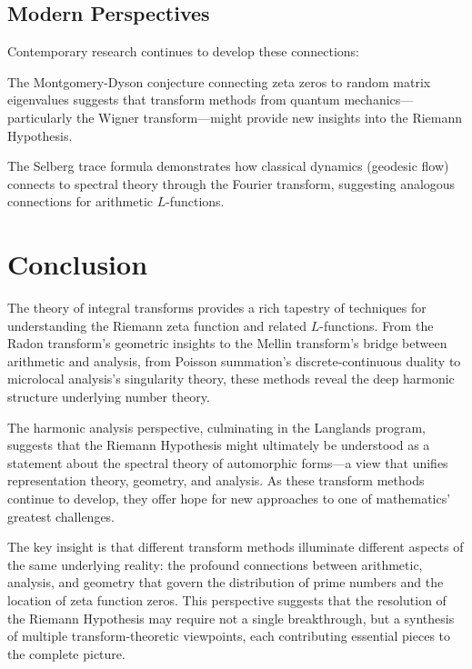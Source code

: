 \subsection{Modern Perspectives}

Contemporary research continues to develop these connections:

\begin{example}
The Montgomery-Dyson conjecture connecting zeta zeros to random matrix eigenvalues suggests that transform methods from quantum mechanics—particularly the Wigner transform—might provide new insights into the Riemann Hypothesis.
\end{example}

\begin{example}
The Selberg trace formula demonstrates how classical dynamics (geodesic flow) connects to spectral theory through the Fourier transform, suggesting analogous connections for arithmetic $L$-functions.
\end{example}

\section{Conclusion}

The theory of integral transforms provides a rich tapestry of techniques for understanding the Riemann zeta function and related $L$-functions. From the Radon transform's geometric insights to the Mellin transform's bridge between arithmetic and analysis, from Poisson summation's discrete-continuous duality to microlocal analysis's singularity theory, these methods reveal the deep harmonic structure underlying number theory.

The harmonic analysis perspective, culminating in the Langlands program, suggests that the Riemann Hypothesis might ultimately be understood as a statement about the spectral theory of automorphic forms—a view that unifies representation theory, geometry, and analysis. As these transform methods continue to develop, they offer hope for new approaches to one of mathematics' greatest challenges.

The key insight is that different transform methods illuminate different aspects of the same underlying reality: the profound connections between arithmetic, analysis, and geometry that govern the distribution of prime numbers and the location of zeta function zeros. This perspective suggests that the resolution of the Riemann Hypothesis may require not a single breakthrough, but a synthesis of multiple transform-theoretic viewpoints, each contributing essential pieces to the complete picture.
